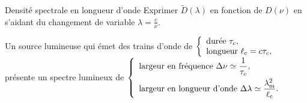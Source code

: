 \documentclass[12pt,fancy]{cours}
\begin{document}
\begin{exemple}{Densité spectrale en longueur d’onde}
  Exprimer $\tilde{D}(\lambda)$ en fonction de $D(\nu)$ en s'aidant du changement de variable $\lambda = \frac{c}{\nu}$.
\end{exemple}



\begin{prop}
Un source lumineuse qui émet des trains d’onde de 
$
\left\{
\begin{array}{l}
  \text{durée } \tau_c, \\ 
  \text{longueur } \ell_{\rm c} = c \tau_c, \\
\end{array}
\right.
$\\
présente un spectre lumineux de 
$
\left\{
\begin{array}{l}
  \text{largeur en fréquence } \Delta \nu \simeq \displaystyle\frac{1}{\tau_c}, \\[0.3cm] 
  \text{largeur en longueur d’onde } \Delta \lambda \simeq \displaystyle\frac{\lambda_{\rm m}^2}{\ell_{\rm c}}.
\end{array}
\right.
$
\end{prop}
\end{document}
